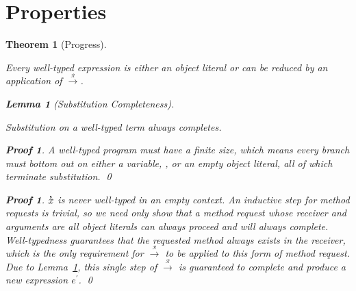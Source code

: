 \documentclass[a4paper, 11pt]{article}
\newcommand{\self}{\text{\sffamily\bfseries self}}
\def\rto{\overset{_\mathcal{R}}\longrightarrow}
\def\xs{\overset{_\text{\sffamily\bfseries s}}x}
\theoremstyle{theorem}
\newtheorem{theorem}{Theorem}
\theoremstyle{lemma}
\newtheorem{lemma}{Lemma}[theorem]
\theoremstyle{tproof}
\newtheorem*{tproof}{Proof}
\theoremstyle{lproof}
\newtheorem*{lproof}{Proof}
\theoremstyle{tcase}
\theoremstyle{lcase}
\begin{document}
\section{Properties}

\begin{theorem}[Progress]
\label{th:progress}

Every well-typed expression is either an object literal or can be reduced by an
application of $\rto$.

\begin{lemma}[Substitution Completeness]
\label{lem:sub-complete}

Substitution on a well-typed term always completes.

\begin{lproof}
A well-typed program must have a finite size, which means every branch must
bottom out on either a variable, \self, or an empty object literal, all of which
terminate substitution. \qed
\end{lproof}

\end{lemma}

\begin{tproof}

$\xs$ is never well-typed in an empty context.  An inductive step for method
requests is trivial, so we need only show that a method request whose receiver
and arguments are all object literals can always proceed and will always
complete.  Well-typedness guarantees that the requested method always exists in
the receiver, which is the only requirement for $\rto$ to be applied to this
form of method request.  Due to Lemma~\ref{lem:sub-complete}, this single step
of $\rto$ is guaranteed to complete and produce a new expression $e^\prime$.
\qed

\end{tproof}

\end{theorem}
\end{document}

